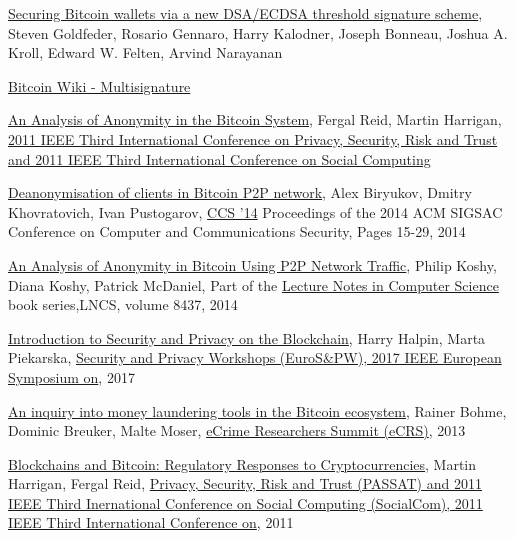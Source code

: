 \begin{thebibliography}{1}
\href{https://www.cs.princeton.edu/~stevenag/threshold_sigs.pdf}{Securing
Bitcoin wallets via a new DSA/ECDSA threshold signature scheme}, Steven
Goldfeder, Rosario Gennaro, Harry Kalodner, Joseph Bonneau, Joshua A. Kroll,
Edward W. Felten, Arvind Narayanan

\href{https://en.bitcoin.it/w/index.php?title=Multisignature&oldid=64634#Multisignature_Applications}
{Bitcoin Wiki - Multisignature}

\href{http://ieeexplore.ieee.org/document/6113303/}{An Analysis of Anonymity in
the Bitcoin System}, Fergal Reid, Martin Harrigan,
\href{http://ieeexplore.ieee.org/xpl/mostRecentIssue.jsp?punumber=6112285}{2011
IEEE Third International Conference on Privacy, Security, Risk and Trust and
2011 IEEE Third International Conference on Social Computing}

\href{https://arxiv.org/pdf/1405.7418.pdf}{Deanonymisation of clients in
Bitcoin P2P network}, Alex Biryukov, Dmitry Khovratovich, Ivan Pustogarov,
\href{http://www.sigsac.org/ccs/CCS2014/}{CCS '14} Proceedings of the 2014 ACM
SIGSAC Conference on Computer and Communications Security, Pages 15-29, 2014

\href{https://www.ifca.ai/fc14/papers/fc14_submission_71.pdf}{An Analysis of
Anonymity in Bitcoin Using P2P Network Traffic}, Philip Koshy, Diana Koshy,
Patrick McDaniel, Part of the \href{https://link.springer.com/bookseries/558}
{Lecture Notes in Computer Science} book series,LNCS, volume 8437, 2014

\href{https://hal.inria.fr/hal-01673293/document}{Introduction to Security and
Privacy on the Blockchain}, Harry Halpin, Marta Piekarska,
\href{http://ieeexplore.ieee.org/xpl/mostRecentIssue.jsp?punumber=7966454}
{Security and Privacy Workshops (EuroS\&PW), 2017 IEEE European Symposium on},
2017

\href{http://ieeexplore.ieee.org/document/6805780/}{An inquiry into money
laundering tools in the Bitcoin ecosystem}, Rainer Bohme, Dominic Breuker,
Malte Moser,
\href{http://ieeexplore.ieee.org/xpl/mostRecentIssue.jsp?punumber=6802823}
{eCrime Researchers Summit (eCRS)}, 2013

\href{https://papers.ssrn.com/sol3/papers.cfm?abstract_id=2704852}
{Blockchains and Bitcoin: Regulatory Responses to Cryptocurrencies}, 
Martin Harrigan, Fergal Reid, 
\href{http://ieeexplore.ieee.org/xpl/mostRecentIssue.jsp?punumber=6112285}
{Privacy, Security, Risk and Trust (PASSAT) and 2011 IEEE Third Inernational
Conference on Social Computing (SocialCom), 2011 IEEE Third International
Conference on}, 2011


\end{thebibliography}
